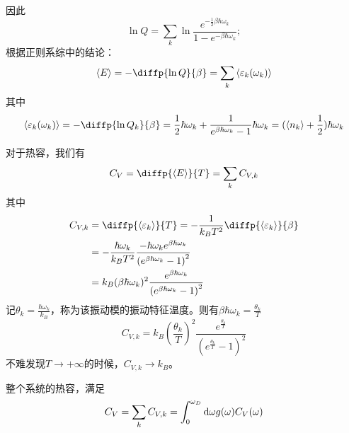 因此\begin{equation}
    \ln Q=\sum_k \ln \frac{e^{-\frac{1}{2}\beta \hbar \omega_k}}{1-e^{-\beta \hbar \omega_k}};
\end{equation}
根据正则系综中的结论：\begin{gather}
    \braket{E} =-\diffp{\ln Q}{\beta} =\sum_k \braket{\varepsilon_k(\omega_k)}    
\end{gather}
其中\begin{equation}
    \braket{\varepsilon_k(\omega_k)} =-\diffp{{\ln Q_k}}{\beta} =\frac{1}{2}\hbar \omega_k +\frac{1}{e^{\beta \hbar \omega_k}-1} \hbar \omega_k=(\braket{n_k}+\frac{1}{2}) \hbar \omega_k
\end{equation}

对于热容，我们有\begin{equation}
    C_V =\diffp{{\braket{E}}}{T} =\sum_k C_{V,k}
\end{equation}
其中\begin{equation}
\begin{aligned}
    C_{V,k}& =\diffp{\braket{\varepsilon_k}}{T} =-\frac{1}{k_B T^2} \diffp{\braket{\varepsilon_k}}{\beta}\\
    & =-\frac{\hbar\omega_k}{k_B T^2} \frac{-\hbar\omega_k e^{\beta\hbar\omega_k} }{\left(e^{\beta\hbar\omega_k}-1\right)^2}\\
    &=k_B (\beta\hbar\omega_k)^2 \frac{e^{\beta \hbar \omega_k}}{\left(e^{\beta\hbar\omega_k}-1\right)^2}
\end{aligned}
\end{equation}
记$\displaystyle \theta_k =\frac{\hbar \omega_k}{k_B}$，称为该振动模的振动特征温度。则有$\displaystyle \beta \hbar \omega_k=\frac{\theta_k}{T}$\begin{equation}
    C_{V,k} =k_B \left(\frac{\theta_k}{T}\right)^2 \frac{e^{\frac{\theta_k}{T}}}{(e^{\frac{\theta_k}{T}}-1)^2}
\end{equation}
不难发现$T\to+\infty$的时候，$C_{V,k}\to k_B$。

整个系统的热容，满足\begin{equation}
    C_V =\sum_k C_{V,k} =\int_0^{\omega_D} \mathrm{d} \omega g(\omega)C_V(\omega)
\end{equation}

